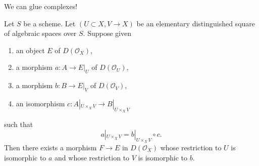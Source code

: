 \noindent
We can glue complexes!

\begin{lemma}
\label{lemma-glue}
Let $S$ be a scheme. Let $(U \subset X, V \to X)$ be an elementary
distinguished square of algebraic spaces over $S$. Suppose given
\begin{enumerate}
\item an object $E$ of $D(\mathcal{O}_X)$,
\item a morphism $a : A \to E|_U$ of $D(\mathcal{O}_U)$,
\item a morphism $b : B \to E|_V$ of $D(\mathcal{O}_V)$,
\item an isomorphism $c : A|_{U \times_X V} \to B|_{U \times_X V}$
\end{enumerate}
such that
$$
a|_{U \times_X V}  = b|_{U \times_X V} \circ c.
$$
Then there exists a morphism $F \to E$ in $D(\mathcal{O}_X)$
whose restriction to $U$ is isomorphic to $a$
and whose restriction to $V$ is isomorphic to $b$.
\end{lemma}

